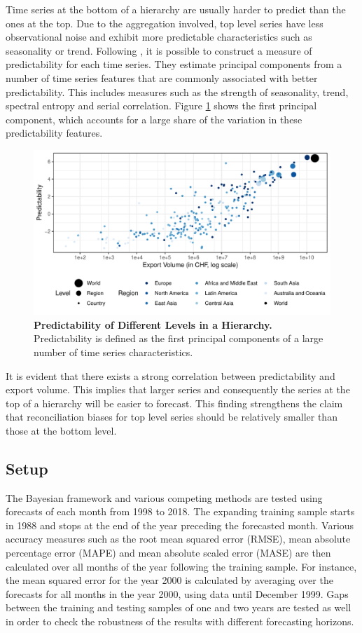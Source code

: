 \documentclass[a4paper,fleqn,11pt]{article}
\begin{document}
Time series at the bottom of a hierarchy are usually harder to predict than the ones at the top. Due to the aggregation involved, top level series have less observational noise and exhibit more predictable characteristics such as seasonality or trend. Following \cite{Kang2017}, it is possible to construct a measure of predictability for each time series. They estimate principal components from a number of time series features that are commonly associated with better predictability. This includes measures such as the strength of seasonality, trend, spectral entropy and serial correlation. Figure \ref{fig:feature} shows the first principal component, which accounts for a large share of the variation in these predictability features.
\begin{figure}[H]
	\includegraphics[width=\textwidth]{fig/fig_confetti}
	\caption[Predictability of Different Levels in a Hierarchy]{\textbf{Predictability of Different Levels in a Hierarchy.} Predictability is defined as the first principal components of a large number of time series characteristics.} \label{fig:feature}
\end{figure}
It is evident that there exists a strong correlation between predictability and export volume. This implies that larger series and consequently the series at the top of a hierarchy will be easier to forecast. This finding strengthens the claim that reconciliation biases for top level series should be relatively smaller than those at the bottom level.\\


\subsection{Setup}
The Bayesian framework and various competing methods are tested using forecasts of each month from 1998 to 2018. The expanding training sample starts in 1988 and stops at the end of the year preceding the forecasted month. Various accuracy measures such as the root mean squared error (RMSE), mean absolute percentage error (MAPE) and mean absolute scaled error (MASE) are then calculated over all months of the year following the training sample. For instance, the mean squared error for the year 2000 is calculated by averaging over the forecasts for all months in the year 2000, using data until December 1999. Gaps between the training and testing samples of one and two years are tested as well in order to check the robustness of the results with different forecasting horizons.\\
\end{document}
